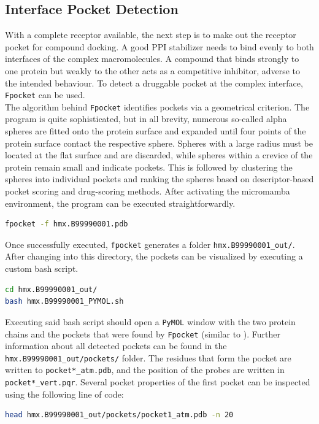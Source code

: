 \documentclass[9pt,tutorial]{livecoms}
\newcommand{\code}[1]{\colorbox{light-gray}{\texttt{#1}}}
\begin{document}
\subsection*{Interface Pocket Detection}
With a complete receptor available, the next step is to make out the receptor pocket for compound docking. A good PPI stabilizer needs to bind evenly to both interfaces of the complex macromolecules. A compound that binds strongly to one protein but weakly to the other acts as a competitive inhibitor, adverse to the intended behaviour. To detect a druggable pocket at the complex interface, \texttt{Fpocket}\cite{le_guilloux_fpocket_2009} can be used.\\
The algorithm behind \texttt{Fpocket} identifies pockets via a geometrical criterion. The program is quite sophisticated, but in all brevity, numerous so-called alpha spheres are fitted onto the protein surface and expanded until four points of the protein surface contact the respective sphere. Spheres with a large radius must be located at the flat surface and are discarded, while spheres within a crevice of the protein remain small and indicate pockets. This is followed by clustering the spheres into individual pockets and ranking the spheres based on descriptor-based pocket scoring and drug-scoring methods.\cite{le_guilloux_fpocket_2009} After activating the micromamba environment, the program can be executed straightforwardly.
\begin{lstlisting}[language=bash]
fpocket -f hmx.B99990001.pdb
\end{lstlisting}
Once successfully executed, \code{fpocket} generates a folder \code{hmx.B99990001\_out/}. After changing into this directory, the pockets can be visualized by executing a custom bash script.
\begin{lstlisting}[language=bash]
cd hmx.B99990001_out/
bash hmx.B99990001_PYMOL.sh
\end{lstlisting}
Executing said bash script should open a \texttt{PyMOL} window with the two protein chains and the pockets that were found by \texttt{Fpocket} (similar to ). Further information about all detected pockets can be found in the \code{hmx.B99990001\_out/pockets/} folder. The residues that form the pocket are written to \code{pocket*\_atm.pdb}, and the position of the probes are written in \code{pocket*\_vert.pqr}. Several pocket properties of the first pocket can be inspected using the following line of code:
\begin{lstlisting}[language=bash]
head hmx.B99990001_out/pockets/pocket1_atm.pdb -n 20
\end{lstlisting}
\end{document}

